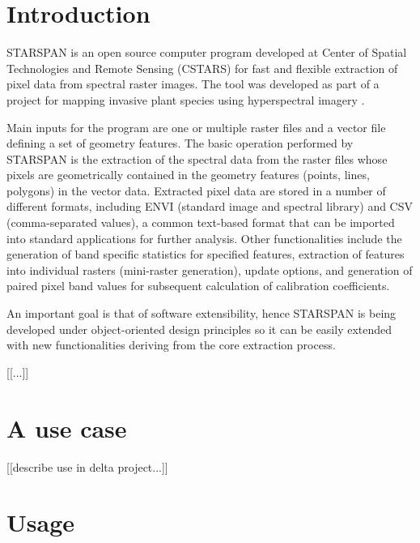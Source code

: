 \documentclass{elsart}
\begin{document}
\section{Introduction}\label{intro}

	STARSPAN is an open source computer program developed at Center of
	Spatial Technologies and Remote Sensing (CSTARS) for fast and flexible
	extraction of pixel data from spectral raster images. The tool was developed
	as part of a project for mapping invasive plant species using hyperspectral
	imagery \citep{ustin04}.
	
	Main inputs for the program are one or multiple raster files and a vector
	file defining a set of geometry features. The basic operation performed by
	STARSPAN is the extraction of the spectral data from the raster files
	whose pixels are geometrically contained in the geometry features (points,
	lines, polygons) in the vector data. Extracted pixel data are stored in a
	number of different formats, including ENVI \citep{envi} (standard image and
	spectral library) and CSV (comma-separated values), a common text-based
	format that can be imported into standard applications for further analysis.
	Other functionalities include the generation of band specific statistics for
	specified features, extraction of features into individual rasters
	(mini-raster generation), update options, and generation of paired pixel
	band values for subsequent calculation of calibration coefficients.
	
	An important goal is that of software extensibility, hence STARSPAN is
	being developed under object-oriented design principles so it can be easily
	extended with new functionalities deriving from the core extraction process.

	[[...]]

\section{A use case}

	[[describe use in delta project...]]

\section{Usage}
\end{document}
